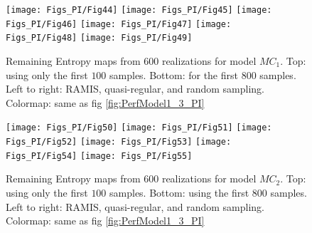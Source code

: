 \begin{figure}[!ht]
    \centering
    \texttt{[image: Figs\_PI/Fig44]}
    \texttt{[image: Figs\_PI/Fig45]}
    \texttt{[image: Figs\_PI/Fig46]}
    \texttt{[image: Figs\_PI/Fig47]}
    \texttt{[image: Figs\_PI/Fig48]}
    \texttt{[image: Figs\_PI/Fig49]}
	\caption[Remaining Entropy maps from $600$ realizations for model $MC_1$.]{\label{fig:PerfModel2_3_PI} Remaining Entropy maps from $600$ realizations for model $MC_1$. Top: using only the first $100$ samples. Bottom: for the first $800$ samples. Left to right: RAMIS, quasi-regular, and random sampling. Colormap: same as fig \ref{fig:PerfModel1_3_PI}}
\end{figure}

\clearpage
\begin{figure}[!ht]
    \centering
    \texttt{[image: Figs\_PI/Fig50]}
    \texttt{[image: Figs\_PI/Fig51]}
    \texttt{[image: Figs\_PI/Fig52]}
    \texttt{[image: Figs\_PI/Fig53]}
    \texttt{[image: Figs\_PI/Fig54]}
    \texttt{[image: Figs\_PI/Fig55]}
	\caption[Remaining Entropy maps from $600$ realizations for model $MC_2$.]{\label{fig:PerfModel3_3_PI} Remaining Entropy maps from $600$ realizations for model $MC_2$. Top: using only the first $100$ samples. Bottom: using the first $800$ samples. Left to right: RAMIS, quasi-regular, and random sampling. Colormap: same as fig \ref{fig:PerfModel1_3_PI}}
\end{figure}



